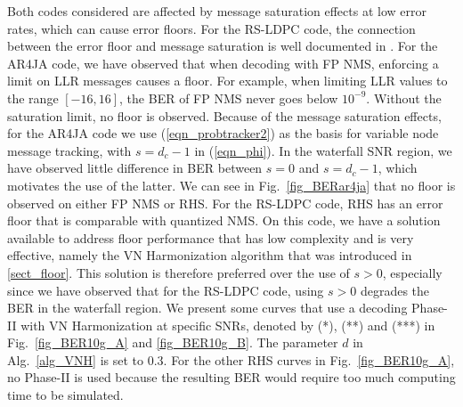 \documentclass[12pt,journal,twoside,draftcls,onecolumn]{IEEEtran}
\begin{document}
Both codes considered are affected by message saturation effects at low error rates, which can cause error floors. For the RS-LDPC code, the connection between the error floor and message saturation is well documented in \cite{schlegel:2010}. For the AR4JA code, we have observed that when decoding with FP NMS, enforcing a limit on LLR messages causes a floor. For example, when limiting LLR values to the range $[-16, 16]$, the BER of FP NMS never goes below $10^{-9}$. Without the saturation limit, no floor is observed.
Because of the message saturation effects, for the AR4JA code we use (\ref{eqn_probtracker2}) as the basis for variable node message tracking, with $s=d_c-1$ in (\ref{eqn_phi}). In the waterfall SNR region, we have observed little difference in BER between $s=0$ and $s=d_c-1$, which motivates the use of the latter. We can see in Fig.~\ref{fig_BERar4ja} that no floor is observed on either FP NMS or RHS.
For the RS-LDPC code, RHS has an error floor that is comparable with quantized NMS. On this code, we have a solution available to address floor performance that has low complexity and is very effective, namely the VN Harmonization algorithm that was introduced in \ref{sect_floor}. This solution is therefore preferred over the use of $s>0$, especially since we have observed that for the RS-LDPC code, using $s>0$ degrades the BER in the waterfall region. We present some curves that use a decoding Phase-II with VN Harmonization at specific SNRs, denoted by (*), (**) and (***) in Fig.~\ref{fig_BER10g_A} and \ref{fig_BER10g_B}. The parameter $d$ in Alg.~\ref{alg_VNH} is set to $0.3$. For the other RHS curves in Fig.~\ref{fig_BER10g_A}, no Phase-II is used because the resulting BER would require too much computing time to be simulated.
\end{document}
